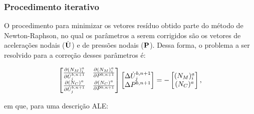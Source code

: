 \documentclass[_ArquivoPrincipal.tex]{subfiles}
\begin{document}
\subsubsection{Procedimento iterativo} \label{Comp-VMS}

O procedimento para minimizar os vetores resíduo obtido parte do método de Newton-Raphson, no qual os parâmetros a serem corrigidos são os vetores de acelerações nodais ($\dot{\mathbf{U}}$) e de pressões nodais ($\mathbf{P}$). Dessa forma, o problema a ser resolvido para a correção desses parâmetros é:

\begin{equation}
    \begin{bmatrix}
        \frac{\partial{(N_M)_i^a}}{\partial{\dot{U}_j^{b,n+1}}} & \frac{\partial{(N_M)_i^a}}{\partial{P^{b,n+1}}} \\
        \frac{\partial{(N_C)^a}}{\partial{\dot{U}_j^{b,n+1}}}   & \frac{\partial{(N_C)^a}}{\partial{P^{b,n+1}}}
    \end{bmatrix}
    \begin{bmatrix}
        \Delta\dot{U}_j^{b,n+1} \\
        \Delta P^{b,n+1}
    \end{bmatrix}=-
    \begin{bmatrix}
        (N_M)_i^a \\
        (N_C)^a
    \end{bmatrix}\text{,}
    \label{Eq:Newton-Raphson}
\end{equation}

\noindent em que, para uma descrição ALE:
\end{document}
